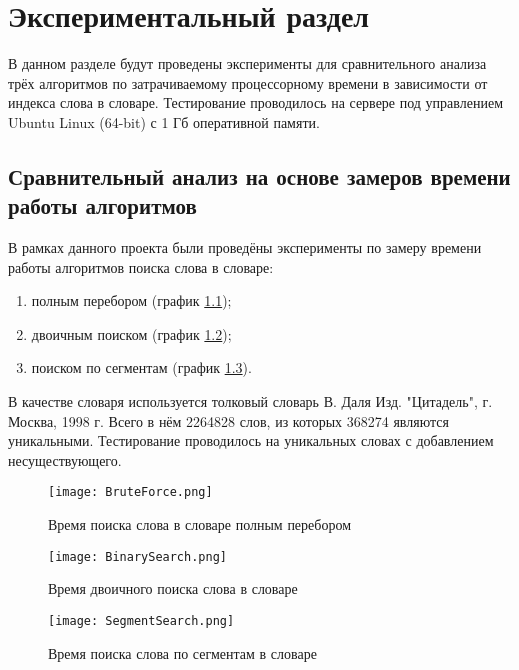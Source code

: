 \chapter{Экспериментальный раздел}
\label{cha:research}
    В данном разделе будут проведены эксперименты 
    для сравнительного анализа трёх алгоритмов по затрачиваемому процессорному 
    времени в зависимости от индекса слова в словаре.
    Тестирование проводилось на сервере
    под управлением Ubuntu Linux (64-bit) с 1 Гб оперативной памяти.

    \section{Сравнительный анализ на основе замеров времени работы алгоритмов}
        В рамках данного проекта были проведёны эксперименты
        по замеру времени работы алгоритмов поиска слова в словаре:
        \begin{enumerate}
            \item полным перебором (график \ref{graph:test:brute-force});
            \item двоичным поиском (график \ref{graph:test:binary});
            \item поиском по сегментам (график \ref{graph:test:segment}).
        \end{enumerate}

        В качестве словаря используется толковый словарь В. Даля Изд. "Цитадель", г. Москва, 1998 г.
        Всего в нём 2264828 слов, из которых 368274 являются уникальными. 
        Тестирование проводилось на уникальных словах с добавлением несуществующего.

        \begin{figure}[h!]
            \centering
                \texttt{[image: BruteForce.png]}
                \caption{Время поиска слова в словаре полным перебором}
                \label{graph:test:brute-force}
        \end{figure}


        
        \begin{figure}[h!]
            \centering
                \texttt{[image: BinarySearch.png]}
                \caption{Время двоичного поиска слова в словаре}
                \label{graph:test:binary}
        \end{figure}

        \begin{figure}[h!]
            \centering
                \texttt{[image: SegmentSearch.png]}
                \caption{Время поиска слова по сегментам в словаре}
                \label{graph:test:segment}
        \end{figure}

